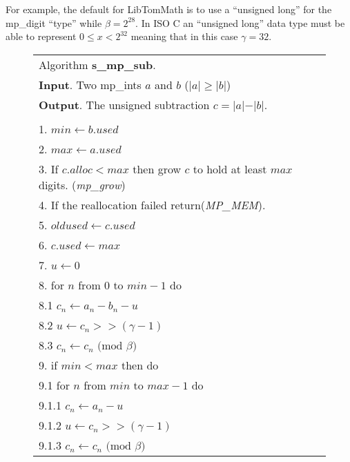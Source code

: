 \documentclass[b5paper]{book}
\begin{document}
For example, the default for LibTomMath is to use a ``unsigned long'' for the mp\_digit ``type'' while $\beta = 2^{28}$.  In ISO C an ``unsigned long''
data type must be able to represent $0 \le x < 2^{32}$ meaning that in this case $\gamma = 32$.

\newpage\begin{figure}[!here]
\begin{center}
\begin{small}
\begin{tabular}{l}
\hline Algorithm \textbf{s\_mp\_sub}. \\
\textbf{Input}.   Two mp\_ints $a$ and $b$ ($\vert a \vert \ge \vert b \vert$) \\
\textbf{Output}.  The unsigned subtraction $c = \vert a \vert - \vert b \vert$. \\
\hline \\
1.  $min \leftarrow b.used$ \\
2.  $max \leftarrow a.used$ \\
3.  If $c.alloc < max$ then grow $c$ to hold at least $max$ digits.  (\textit{mp\_grow}) \\
4.  If the reallocation failed return(\textit{MP\_MEM}). \\
5.  $oldused \leftarrow c.used$ \\ 
6.  $c.used \leftarrow max$ \\
7.  $u \leftarrow 0$ \\
8.  for $n$ from $0$ to $min - 1$ do \\
\hspace{3mm}8.1  $c_n \leftarrow a_n - b_n - u$ \\
\hspace{3mm}8.2  $u   \leftarrow c_n >> (\gamma - 1)$ \\
\hspace{3mm}8.3  $c_n \leftarrow c_n \mbox{ (mod }\beta\mbox{)}$ \\
9.  if $min < max$ then do \\
\hspace{3mm}9.1  for $n$ from $min$ to $max - 1$ do \\
\hspace{6mm}9.1.1  $c_n \leftarrow a_n - u$ \\
\hspace{6mm}9.1.2  $u   \leftarrow c_n >> (\gamma - 1)$ \\
\hspace{6mm}9.1.3  $c_n \leftarrow c_n \mbox{ (mod }\beta\mbox{)}$ \\

\end{tabular}
\end{small}
\end{center}
\end{figure}
\end{document}
